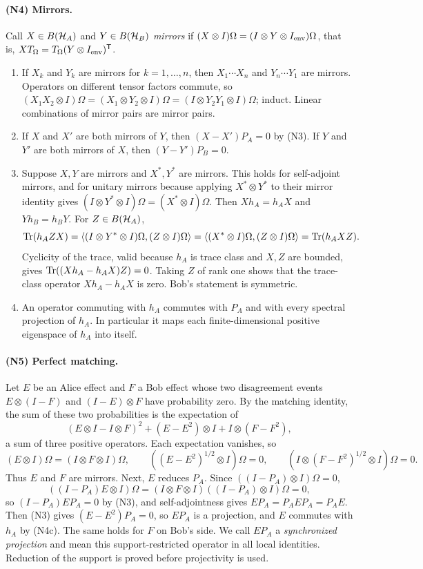 \paragraph{(N4) Mirrors.}
Call $X\in B(\mathcal H_A)$ and $Y\in B(\mathcal H_B)$ \emph{mirrors} if $(X\otimes I)\Omega=(I\otimes Y\otimes I_{\rm env})\Omega$, that is, $XT_\Omega=T_\Omega(Y\otimes I_{\rm env})^{\mathsf T}$.
\begin{enumerate}[label=(\alph*)]
\item If $X_k$ and $Y_k$ are mirrors for $k=1,\ldots,n$, then $X_1\cdots X_n$ and $Y_n\cdots Y_1$ are mirrors. Operators on different tensor factors commute, so $(X_1X_2\otimes I)\Omega=(X_1\otimes Y_2\otimes I)\Omega=(I\otimes Y_2Y_1\otimes I)\Omega$; induct. Linear combinations of mirror pairs are mirror pairs.
\item If $X$ and $X'$ are both mirrors of $Y$, then $(X-X')P_A=0$ by (N3). If $Y$ and $Y'$ are both mirrors of $X$, then $(Y-Y')P_B=0$.
\item Suppose $X,Y$ are mirrors and $X^*,Y^*$ are mirrors. This holds for self-adjoint mirrors, and for unitary mirrors because applying $X^*\otimes Y^*$ to their mirror identity gives $(I\otimes Y^*\otimes I)\Omega=(X^*\otimes I)\Omega$. Then $Xh_A=h_AX$ and $Yh_B=h_BY$. For $Z\in B(\mathcal H_A)$,
\[
 \operatorname{Tr}(h_AZX)=\langle(I\otimes Y^*\otimes I)\Omega,(Z\otimes I)\Omega\rangle
 =\langle(X^*\otimes I)\Omega,(Z\otimes I)\Omega\rangle=\operatorname{Tr}(h_AXZ).
\]
Cyclicity of the trace, valid because $h_A$ is trace class and $X,Z$ are bounded, gives $\operatorname{Tr}((Xh_A-h_AX)Z)=0$. Taking $Z$ of rank one shows that the trace-class operator $Xh_A-h_AX$ is zero. Bob's statement is symmetric.
\item An operator commuting with $h_A$ commutes with $P_A$ and with every spectral projection of $h_A$. In particular it maps each finite-dimensional positive eigenspace of $h_A$ into itself.
\end{enumerate}

\paragraph{(N5) Perfect matching.}
Let $E$ be an Alice effect and $F$ a Bob effect whose two disagreement events $E\otimes(I-F)$ and $(I-E)\otimes F$ have probability zero. By the matching identity, the sum of these two probabilities is the expectation of
\[
 (E\otimes I-I\otimes F)^2+(E-E^2)\otimes I+I\otimes(F-F^2),
\]
a sum of three positive operators. Each expectation vanishes, so
\[
 (E\otimes I)\Omega=(I\otimes F\otimes I)\Omega,\qquad
 ((E-E^2)^{1/2}\otimes I)\Omega=0,\qquad
 (I\otimes(F-F^2)^{1/2}\otimes I)\Omega=0 .
\]
Thus $E$ and $F$ are mirrors. Next, $E$ reduces $P_A$. Since $((I-P_A)\otimes I)\Omega=0$,
\[
 ((I-P_A)E\otimes I)\Omega=(I\otimes F\otimes I)((I-P_A)\otimes I)\Omega=0,
\]
so $(I-P_A)EP_A=0$ by (N3), and self-adjointness gives $EP_A=P_AEP_A=P_AE$. Then (N3) gives $(E-E^2)P_A=0$, so $EP_A$ is a projection, and $E$ commutes with $h_A$ by (N4c). The same holds for $F$ on Bob's side. We call $EP_A$ a \emph{synchronized projection} and mean this support-restricted operator in all local identities. Reduction of the support is proved before projectivity is used.

